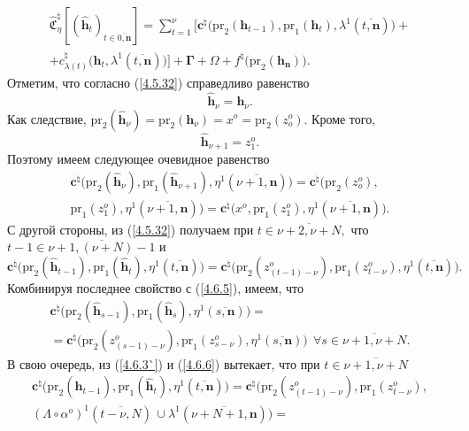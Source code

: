 \documentclass[11pt,twoside]{report}
\newcommand{\ov}{\overline}
\newcommand{\La}{\Lambda}
\newcommand{\la}{\lambda}
\newcommand{\al}{\alpha}
\newcommand{\fa}{\forall}
\newcommand{\zc}{{\mathbf c}}
\newcommand{\nn}{{\mathbf n}}
\begin{document}
{{\begin{eqnarray}
&\widehat{\mathfrak{C}}_\eta^\natural[(\hat{\mathbf{h}}_t)_{t\in\ov{0,\nn}}]=
\sum\limits_{t=1}^\nu \bigl[\zc^\natural\bigl(\mathrm{pr}_2(\mathbf{h}_{t-1}),\mathrm{pr}_1(\mathbf{h}_t),
\la^1(\ov{t,\nn})\bigl) +
&\nonumber\\
&+c_{\la(t)}^\natural\bigl(\mathbf{h}_t,\la^1(\ov{t,\nn})\bigl)\bigl] +\mathbf{\Gamma} +
\Omega + f^\natural\bigl(\mathrm{pr}_2(\mathbf{h}_\nn)\bigl).
&\label{4.6.5``}
\end{eqnarray}
Отметим, что согласно (\ref{4.5.32}) справедливо равенство
$$
\hat{\mathbf{h}}_\nu = \mathbf{h}_\nu.
$$
Как следствие, $\mathrm{pr}_2(\hat{\mathbf{h}}_\nu) = \mathrm{pr}_2(\mathbf{h}_\nu) = x^o = \mathrm{pr}_2(z_o^o).$ Кроме того,
$$
\hat{\mathbf{h}}_{\nu+1} = z_1^o.
$$
Поэтому имеем следующее очевидное равенство
\begin{eqnarray}
&\zc^\natural\bigl(\mathrm{pr}_2(\hat{\mathbf{h}}_\nu),\mathrm{pr}_1
(\hat{\mathbf{h}}_{\nu+1}),\eta^1(\ov{\nu+1,\nn})\bigl)= \zc^\natural\bigl(\mathrm{pr}_2(z_o^o),
&\nonumber\\
&\mathrm{pr}_1 (z_1^o),\eta^1(\ov{\nu+1,\nn})\bigl)= \zc^\natural\bigl(x^o,\mathrm{pr}_1(z_1^o),
\eta^1(\ov{\nu+1,\nn})\bigl).
&\label{4.6.5}
\end{eqnarray}
С другой стороны, из (\ref{4.5.32}) получаем  при $t\in\ov{\nu+2,\nu+N},$ что $t-1 \in \ov{\nu+1,(\nu+N)- 1}$ и
$$
\zc^\natural\bigl(\mathrm{pr}_2(\hat{\mathbf{h}}_{t-1}),\mathrm{pr}_1(\hat{\mathbf{h}}_t),
\eta^1(\ov{t,\nn})\bigl) = \zc^\natural\bigl(\mathrm{pr}_2(z_{(t-1)-\nu}^o),\mathrm{pr}_1(z_{t-\nu}^o),
\eta^1(\ov{t,\nn})\bigl).
$$
Комбинируя последнее свойство с (\ref{4.6.5}), имеем, что
\begin{eqnarray}
&\zc^\natural\bigl(\mathrm{pr}_2(\hat{\mathbf{h}}_{s-1}),\mathrm{pr}_1
(\hat{\mathbf{h}}_s), \eta^1(\ov{s,\nn})\bigl)=
&\nonumber\\
&=\zc^\natural\bigl(\mathrm{pr}_2(z_{(s-1)-\nu}^o),\mathrm{pr}_1(z_{s-\nu}^o),
\eta^1(\ov{s,\nn})\bigl)\ \ \fa s\in \ov{\nu+1,\nu+N}.
\label{4.6.6}
\end{eqnarray}
В свою очередь, из (\ref{4.6.3`}) и (\ref{4.6.6}) вытекает, что при $t\in\ov{\nu+1,\nu+N}$
\begin{eqnarray}
&\zc^\natural\bigl(\mathrm{pr}_2(\hat{\mathbf{h}}_{t-1}),\mathrm{pr}_1
(\hat{\mathbf{h}}_t), \eta^1(\ov{t,\nn})\bigl)=
\zc^\natural\bigl(\mathrm{pr}_2(z_{(t-1)-\nu}^o),\mathrm{pr}_1(z_{t-\nu}^o),
&\nonumber\\
&(\La \circ \al^o)^1(\ov{t-\nu,N})\,\cup
\la^1(\ov{\nu+N+1,\nn})\bigl)=

\end{eqnarray}}}
\end{document}
